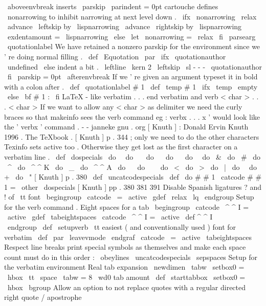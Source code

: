 {{{\
aboveenvbreak
inserts
\
parskip
\
parindent
=
0pt
%
%
cartouche
defines
\
nonarrowing
to
inhibit
narrowing
at
next
level
down
.
\
ifx
\
nonarrowing
\
relax
\
advance
\
leftskip
by
\
lispnarrowing
\
advance
\
rightskip
by
\
lispnarrowing
\
exdentamount
=
\
lispnarrowing
\
else
\
let
\
nonarrowing
=
\
relax
\
fi
\
parsearg
\
quotationlabel
}
%
We
have
retained
a
nonzero
parskip
for
the
environment
since
we
'
re
%
doing
normal
filling
.
%
\
def
\
Equotation
{
%
\
par
\
ifx
\
quotationauthor
\
undefined
\
else
%
indent
a
bit
.
\
leftline
{
\
kern
2
\
leftskip
\
sl
-
-
-
\
quotationauthor
}
%
\
fi
{
\
parskip
=
0pt
\
afterenvbreak
}
%
}
%
If
we
'
re
given
an
argument
typeset
it
in
bold
with
a
colon
after
.
\
def
\
quotationlabel
#
1
{
%
\
def
\
temp
{
#
1
}
%
\
ifx
\
temp
\
empty
\
else
{
\
bf
#
1
:
}
%
\
fi
}
%
LaTeX
-
like
verbatim
.
.
.
end
verbatim
and
verb
{
<
char
>
.
.
.
<
char
>
}
%
If
we
want
to
allow
any
<
char
>
as
delimiter
%
we
need
the
curly
braces
so
that
makeinfo
sees
the
verb
command
eg
:
%
verbx
.
.
.
x
'
would
look
like
the
'
verbx
'
command
.
-
-
janneke
gnu
.
org
%
%
[
Knuth
]
:
Donald
Ervin
Knuth
1996
.
The
TeXbook
.
%
%
[
Knuth
]
p
.
344
;
only
we
need
to
do
the
other
characters
Texinfo
sets
%
active
too
.
Otherwise
they
get
lost
as
the
first
character
on
a
%
verbatim
line
.
\
def
\
dospecials
{
%
\
do
\
\
do
\
\
\
do
\
{
\
do
\
}
\
do
\
\
do
\
&
%
\
do
\
#
\
do
\
^
\
do
\
^
^
K
\
do
\
_
\
do
\
^
^
A
\
do
\
%
\
do
\
~
%
\
do
\
<
\
do
\
>
\
do
\
|
\
do
\
\
do
+
\
do
\
"
%
}
%
%
[
Knuth
]
p
.
380
\
def
\
uncatcodespecials
{
%
\
def
\
do
#
#
1
{
\
catcode
#
#
1
=
\
other
}
\
dospecials
}
%
%
[
Knuth
]
pp
.
380
381
391
%
Disable
Spanish
ligatures
?
and
!
of
\
tt
font
\
begingroup
\
catcode
\
=
\
active
\
gdef
{
\
relax
\
lq
}
\
endgroup
%
%
Setup
for
the
verb
command
.
%
%
Eight
spaces
for
a
tab
\
begingroup
\
catcode
\
^
^
I
=
\
active
\
gdef
\
tabeightspaces
{
\
catcode
\
^
^
I
=
\
active
\
def
^
^
I
{
\
\
\
\
\
\
\
\
}
}
\
endgroup
%
\
def
\
setupverb
{
%
\
tt
%
easiest
(
and
conventionally
used
)
font
for
verbatim
\
def
\
par
{
\
leavevmode
\
endgraf
}
%
\
catcode
\
=
\
active
\
tabeightspaces
%
Respect
line
breaks
%
print
special
symbols
as
themselves
and
%
make
each
space
count
%
must
do
in
this
order
:
\
obeylines
\
uncatcodespecials
\
sepspaces
}
%
Setup
for
the
verbatim
environment
%
%
Real
tab
expansion
\
newdimen
\
tabw
\
setbox0
=
\
hbox
{
\
tt
\
space
}
\
tabw
=
8
\
wd0
%
tab
amount
%
\
def
\
starttabbox
{
\
setbox0
=
\
hbox
\
bgroup
}
%
Allow
an
option
to
not
replace
quotes
with
a
regular
directed
right
%
quote
/
apostrophe
}}
